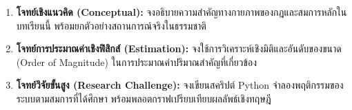 \begin{enumerate}[leftmargin=1.5cm, label={\textbf{\thechapter.\arabic*}}, itemsep=8pt]
    \item \textbf{โจทย์เชิงแนวคิด (Conceptual):} จงอธิบายความสำคัญทางกายภาพของกฎและสมการหลักในบทเรียนนี้ พร้อมยกตัวอย่างสถานการณ์จริงในธรรมชาติ
    \item \textbf{โจทย์การประมาณค่าเชิงฟิสิกส์ (Estimation):} จงใช้การวิเคราะห์เชิงมิติและอันดับของขนาด (Order of Magnitude) ในการประมาณค่าปริมาณสำคัญที่เกี่ยวข้อง
    \item \textbf{โจทย์วิจัยขั้นสูง (Research Challenge):} จงเขียนสคริปต์ Python จำลองพฤติกรรมของระบบตามสมการที่ได้ศึกษา พร้อมพลอตกราฟเปรียบเทียบผลลัพธ์เชิงทฤษฎี
\end{enumerate}

